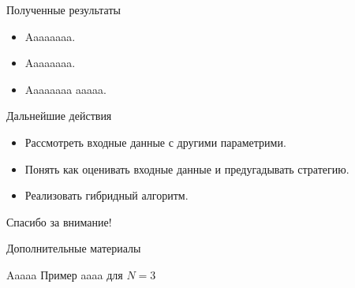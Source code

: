 \documentclass{beamer}
\begin{document}
\begin{frame}{Полученные результаты}
\begin{block}{}
\begin{itemize}
\item Aaaaaaaa.
\item Aaaaaaaa.
\item Aaaaaaaa aaaaa.
\end{itemize}
\end{block}
\end{frame}


\begin{frame}{Дальнейшие действия}
\begin{block}{}
\begin{itemize}
\item Рассмотреть входные данные с другими параметрими. 
\item Понять как оценивать входные данные и предугадывать стратегию.
\item Реализовать гибридный алгоритм.
\end{itemize}
\end{block}
\end{frame}


\begin{frame}{}
\begin{center}
Спасибо за внимание!
\end{center}
\end{frame}

\begin{frame}{Дополнительные материалы}
\begin{block}{Aaaaa}
Пример aaaa для $N = 3$
\begin{center}
\end{center}
\end{block}
\end{frame}
\end{document}
